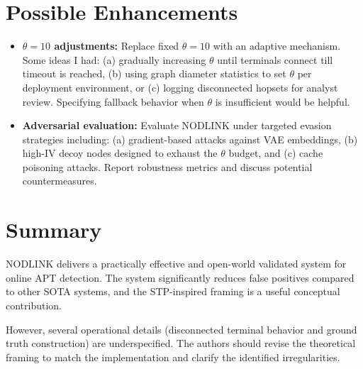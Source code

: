 \documentclass[11pt]{article}
\begin{document}
\section*{Possible Enhancements}
\begin{itemize}
    \item \textbf{$\theta=10$ adjustments:} Replace fixed $\theta=10$ with an adaptive mechanism. Some ideas I had: (a) gradually increasing $\theta$ until terminals connect till timeout is reached, (b) using graph diameter statistics to set $\theta$ per deployment environment, or (c) logging disconnected hopsets for analyst review. Specifying fallback behavior when $\theta$ is insufficient would be helpful.
    \item \textbf{Adversarial evaluation:} Evaluate NODLINK under targeted evasion strategies including: (a) gradient-based attacks against VAE embeddings, (b) high-IV decoy nodes designed to exhaust the $\theta$ budget, and (c) cache poisoning attacks. Report robustness metrics and discuss potential countermeasures.
\end{itemize}

\section*{Summary}
NODLINK delivers a practically effective and open-world validated system for online APT detection. The system significantly reduces false positives compared to other SOTA systems, and the STP-inspired framing is a useful conceptual contribution.

However, several operational details (disconnected terminal behavior and ground truth construction) are underspecified. The authors should revise the theoretical framing to match the implementation and clarify the identified irregularities.
\end{document}
